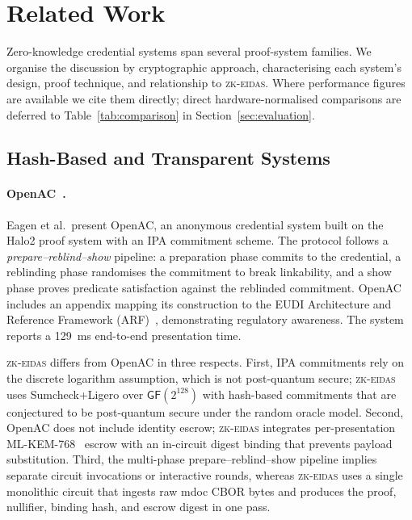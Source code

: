 \section{Related Work}\label{sec:related}

Zero-knowledge credential systems span several proof-system families.
We organise the discussion by cryptographic approach, characterising each
system's design, proof technique, and relationship to \textsc{zk-eidas}.
Where performance figures are available we cite them directly; direct
hardware-normalised comparisons are deferred to Table~\ref{tab:comparison}
in Section~\ref{sec:evaluation}.

\subsection{Hash-Based and Transparent Systems}\label{sec:rel-hash}

\paragraph{OpenAC~\cite{openac}.}
Eagen et al.\ present OpenAC, an anonymous credential system built on
the Halo2 proof system with an IPA commitment scheme.  The protocol
follows a \emph{prepare–reblind–show} pipeline: a preparation phase
commits to the credential, a reblinding phase randomises the commitment
to break linkability, and a show phase proves predicate satisfaction
against the reblinded commitment.  OpenAC includes an appendix mapping
its construction to the EUDI Architecture and Reference Framework
(ARF)~\cite{eudi-arf}, demonstrating regulatory awareness.
The system reports a 129~ms end-to-end presentation time.

\textsc{zk-eidas} differs from OpenAC in three respects.
First, IPA commitments rely on the discrete logarithm assumption, which
is not post-quantum secure; \textsc{zk-eidas} uses Sumcheck+Ligero over
$\mathsf{GF}(2^{128})$ with hash-based commitments that are conjectured
to be post-quantum secure under the random oracle model.
Second, OpenAC does not include identity escrow; \textsc{zk-eidas}
integrates per-presentation ML-KEM-768~\cite{fips203} escrow with an
in-circuit digest binding that prevents payload substitution.
Third, the multi-phase prepare–reblind–show pipeline implies separate
circuit invocations or interactive rounds, whereas \textsc{zk-eidas}
uses a single monolithic circuit that ingests raw mdoc CBOR bytes and
produces the proof, nullifier, binding hash, and escrow digest in one pass.

